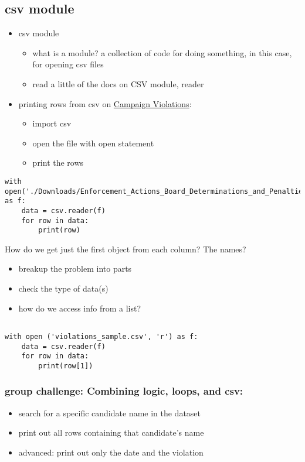 \documentclass[11pt]{article}
\begin{document}
\subsection{csv module}
\label{sec:org95fe6e5}
\begin{itemize}
\item csv module
\begin{itemize}
\item what is a module? a collection of code for doing something, in
this case, for opening csv files
\item read a little of the docs on CSV module, reader
\end{itemize}

\item printing rows from csv on \href{https://data.cityofnewyork.us/City-Government/Enforcement-Actions-Board-Determinations-and-Penal/xrxs-qn95/about\_data}{Campaign Violations}:
\begin{itemize}
\item import csv
\item open the file with open statement
\item print the rows
\end{itemize}
\end{itemize}

\begin{verbatim}
with open('./Downloads/Enforcement_Actions_Board_Determinations_and_Penalties_20250210.csv') as f:
    data = csv.reader(f)
    for row in data:
        print(row)
\end{verbatim}

How do we get just the first object from each column? The names?
\begin{itemize}
\item breakup the problem into parts
\item check the type of data(s)
\item how do we access info from a list?
\end{itemize}

\begin{verbatim}

with open ('violations_sample.csv', 'r') as f:
    data = csv.reader(f)
    for row in data:
        print(row[1])

\end{verbatim}

\subsubsection{group challenge: Combining logic, loops, and csv:}
\label{sec:orgb09298e}
\begin{itemize}
\item search for a specific candidate name in the dataset
\item print out all rows containing that candidate's name
\item advanced: print out only the date and the violation
\end{itemize}
\end{document}

